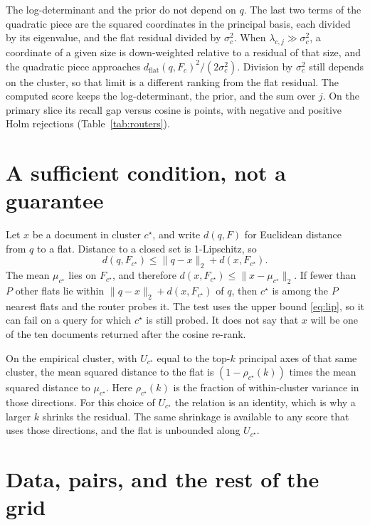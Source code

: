 \documentclass[sigconf,nonacm]{acmart}
\begin{document}
The log-determinant and the prior do not depend on $q$. The last two terms of the quadratic piece are the squared coordinates in the principal basis, each divided by its eigenvalue, and the flat residual divided by $\sigma_c^2$. When $\lambda_{c,j} \gg \sigma_c^2$, a coordinate of a given size is down-weighted relative to a residual of that size, and the quadratic piece approaches $d_{\mathrm{flat}}(q,F_c)^2/(2\sigma_c^2)$. Division by $\sigma_c^2$ still depends on the cluster, so that limit is a different ranking from the flat residual. The computed score keeps the log-determinant, the prior, and the sum over $j$. On the primary slice its recall gap versus cosine is \PpcaR{} points, with \PpcaDn{} negative and \PpcaUp{} positive Holm rejections (Table~\ref{tab:routers}).

\section{A sufficient condition, not a guarantee}
\label{app:why}

Let $x$ be a document in cluster $c^\star$, and write $d(q,F)$ for Euclidean distance from $q$ to a flat. Distance to a closed set is 1-Lipschitz, so
\begin{equation}
  d(q, F_{c^\star}) \le \|q-x\|_2 + d(x, F_{c^\star}).
  \label{eq:lip}
\end{equation}
The mean $\mu_{c^\star}$ lies on $F_{c^\star}$, and therefore $d(x, F_{c^\star}) \le \|x-\mu_{c^\star}\|_2$. If fewer than $P$ other flats lie within $\|q-x\|_2 + d(x, F_{c^\star})$ of $q$, then $c^\star$ is among the $P$ nearest flats and the router probes it. The test uses the upper bound \eqref{eq:lip}, so it can fail on a query for which $c^\star$ is still probed. It does not say that $x$ will be one of the ten documents returned after the cosine re-rank.

On the empirical cluster, with $U_{c^\star}$ equal to the top-$k$ principal axes of that same cluster, the mean squared distance to the flat is $(1-\rho_{c^\star}(k))$ times the mean squared distance to $\mu_{c^\star}$. Here $\rho_{c^\star}(k)$ is the fraction of within-cluster variance in those directions. For this choice of $U_{c^\star}$ the relation is an identity, which is why a larger $k$ shrinks the residual. The same shrinkage is available to any score that uses those directions, and the flat is unbounded along $U_{c^\star}$.

\section{Data, pairs, and the rest of the grid}
\label{app:tables}
\end{document}
